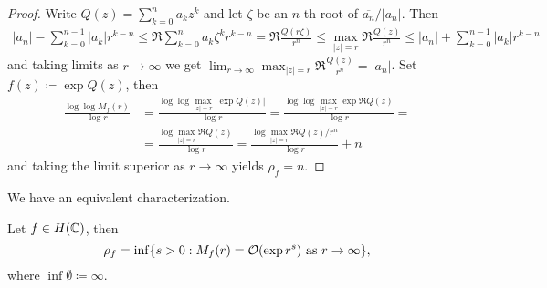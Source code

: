 \begin{proof}
    Write $Q(z) = \sum_{k=0}^n a_k z^k$ and let $\zeta$ be an $n$-th root of $\overline{a_n} / \vert a_n \vert$. Then
    \begin{align*}
        \vert a_n \vert - \sum_{k=0}^{n-1} \vert a_k \vert r^{k-n} \leq \Re \sum_{k=0}^{n} a_k \zeta^k r^{k-n} = \Re \frac{Q(r \zeta)}{r^n} \leq \max_{\vert z \vert = r} \Re \frac{Q(z)}{r^n} \leq \vert a_n \vert + \sum_{k=0}^{n-1} \vert a_k \vert r^{k-n}
    \end{align*}
    and taking limits as $r \to \infty$ we get $\lim_{r \to \infty} \max_{\vert z \vert = r} \Re \frac{Q(z)}{r^n} = \vert a_n \vert$. Set $f(z) \coloneqq \exp Q(z)$, then
    \begin{align*}
        \frac{\log \log M_f(r)}{\log r} &= \frac{\log \log \max_{\vert z \vert = r} \vert \exp Q(z) \vert}{\log r} = \frac{\log \log \max_{\vert z \vert = r} \exp \Re Q(z)}{\log r} = \\
        &= \frac{\log \max_{\vert z \vert = r} \Re Q(z)}{\log r} = \frac{\log \max_{\vert z \vert = r} \Re Q(z) / r^n}{\log r} + n
    \end{align*}
    and taking the limit superior as $r \to \infty$ yields $\rho_f = n$.
\end{proof}

We have an equivalent characterization.

\begin{proposition} \label{prop:order-infimum}
    Let $f \in H(\mathbb{C})$, then
    \begin{equation} \label{eq:order-infimum}
        \rho_f = \inf \{ s > 0 : M_f(r) = \mathcal{O}(\exp r^s) \textrm{ as } r \to \infty \},
    \end{equation}
    where $\inf \emptyset \coloneqq \infty$.
\end{proposition}

